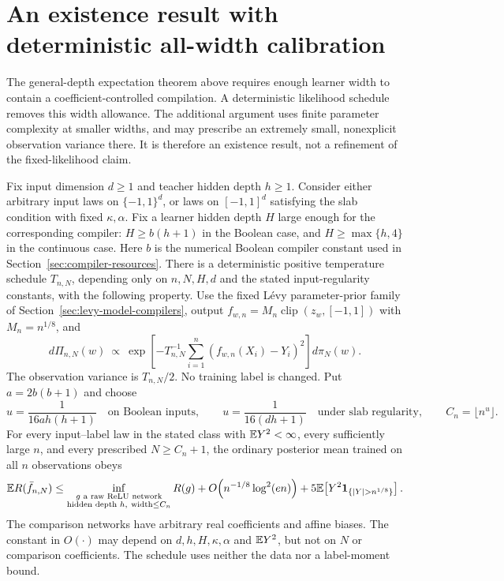 \section{An existence result with deterministic all-width calibration}
\label{sec:deterministic-all-width}

The general-depth expectation theorem above requires enough learner width to
contain a coefficient-controlled compilation.  A deterministic likelihood
schedule removes this width allowance.  The additional argument uses finite
parameter complexity at smaller widths, and may prescribe an extremely small,
nonexplicit observation variance there.  It is therefore an existence result,
not a refinement of the fixed-likelihood claim.

\begin{theorem}
\label{thm:deterministic-all-width}
Fix input dimension $d\ge1$ and teacher hidden depth $h\ge1$.  Consider either
arbitrary input laws on $\{-1,1\}^d$, or laws on $[-1,1]^d$ satisfying the slab
condition with fixed $\kappa,\alpha$.  Fix a learner hidden depth $H$ large
enough for the corresponding compiler: $H\ge b(h+1)$ in the Boolean case,
and $H\ge\max\{h,4\}$ in the continuous case.  Here $b$ is the numerical
Boolean compiler constant used in Section~\ref{sec:compiler-resources}.
There is a deterministic positive temperature schedule $T_{n,N}$, depending
only on $n,N,H,d$ and the stated input-regularity constants, with the following
property.  Use the fixed L\'evy parameter-prior family of Section~\ref{sec:levy-model-compilers},
output $f_{w,n}=M_n\operatorname{clip}(z_w,[-1,1])$ with $M_n=n^{1/8}$, and
\[
 d\Pi_{n,N}(w)\ \propto\
 \exp\!\left[-T_{n,N}^{-1}\sum_{i=1}^n
              (f_{w,n}(X_i)-Y_i)^2\right]d\pi_N(w).
\]
The observation variance is $T_{n,N}/2$.  No training label is changed.
Put $a=2b(b+1)$ and choose
\[
 u=\frac1{16a h(h+1)}\quad\text{on Boolean inputs},\qquad
 u=\frac1{16(dh+1)}\quad\text{under slab regularity},\qquad
 C_n=\lfloor n^u\rfloor.
\]
For every input--label law in the stated class with $\mathbb E Y^2<\infty$, every
sufficiently large $n$, and every prescribed $N\ge C_n+1$, the ordinary
posterior mean trained on all $n$ observations obeys
\begin{equation}\label{eq:deterministic-all-width-oracle}
 \E R(\bar f_{n,N})\le
 \inf_{\substack{g\text{ a raw ReLU network}\\
          \text{hidden depth }h,\ \text{width}\le C_n}}R(g)
 +O\!\left(n^{-1/8}\log^2(en)\right)
 +5\E\!\left[Y^2\mathbf1_{\{|Y|>n^{1/8}\}}\right].
\end{equation}
The comparison networks have arbitrary real coefficients and affine biases.
The constant in $O(\cdot)$ may depend on $d,h,H,\kappa,\alpha$ and
$\mathbb E Y^2$, but not on $N$ or comparison coefficients.  The schedule uses
neither the data nor a label-moment bound.
\end{theorem}

